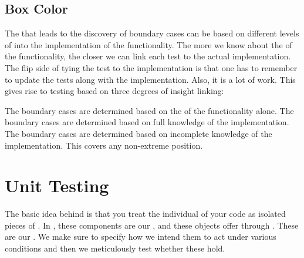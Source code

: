 \subsection{Box Color}

The  that leads to the discovery of boundary cases can be based on different levels of  into the implementation of the functionality. The more we know about the  of the functionality, the closer we can link each test to the actual implementation. The flip side of tying the test to the implementation is that one has to remember to update the tests along with the implementation. Also, it is a lot of work. This  gives rise to testing based on three degrees of insight linking:
\begin{enumerate}
   The boundary cases are determined based on the  of the functionality alone.
   The boundary cases are determined based on full knowledge of the implementation.
   The boundary cases are determined based on incomplete knowledge of the implementation. This covers any non-extreme position.
\end{enumerate}

\section{Unit Testing}

The basic idea behind  is that you treat the individual  of your code as isolated pieces of . In , these components are our , and these objects offer  through . These are our . We make sure to specify how we intend them to act under various conditions and then we meticulously test whether these  hold.

